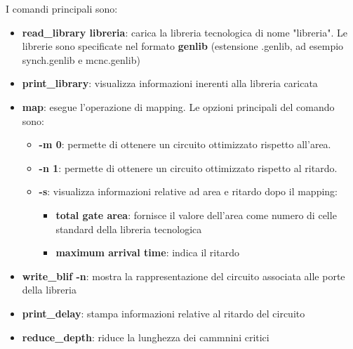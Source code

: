 \documentclass[a4paper]{article}
\theoremstyle{break}
\theoremstyle{break}
\theoremstyle{break}
\theoremstyle{break}
\begin{document}
I comandi principali sono:
\begin{itemize}
  \item \textbf{read\_library libreria}: carica la libreria tecnologica di nome "libreria".
    Le librerie sono specificate nel formato \textbf{genlib} (estensione .genlib, ad esempio
    synch.genlib e mcnc.genlib)
  \item \textbf{print\_library}: visualizza informazioni inerenti alla libreria caricata
  \item \textbf{map}: esegue l’operazione di mapping. Le opzioni principali del
comando sono:
\begin{itemize}
  \item \textbf{-m 0}: permette di ottenere un circuito ottimizzato rispetto all'area.
  \item \textbf{-n 1}: permette di ottenere un circuito ottimizzato rispetto al ritardo.
  \item \textbf{-s}: visualizza informazioni relative ad area e ritardo dopo il mapping:
    \begin{itemize}
      \item \textbf{total gate area}: fornisce il valore dell'area come numero di
        celle standard della libreria tecnologica
      \item \textbf{maximum arrival time}: indica il ritardo
    \end{itemize}
\end{itemize}
  \item \textbf{write\_blif -n}: mostra la rappresentazione del circuito associata alle
porte della libreria
  \item \textbf{print\_delay}: stampa informazioni relative al ritardo del circuito
  \item \textbf{reduce\_depth}: riduce la lunghezza dei cammnini critici
\end{itemize}
\end{document}
